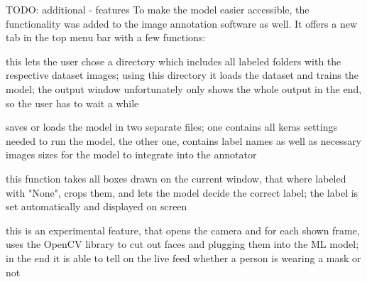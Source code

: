 TODO: additional - features
To make the model easier accessible, the functionality was added to the image
annotation software as well. It offers a new tab in the top menu bar with a few
functions:
\begin{description}[font=\sffamily\bfseries, leftmargin=1cm, style=nextline]
    \item[train model]
        this lets the user chose a directory which includes all labeled folders
        with the respective dataset images; using this directory it loads the
        dataset and trains the model; the output window unfortunately only shows
        the whole output in the end, so the user has to wait a while
    \item[save/load model]
        saves or loads the model in two separate files; one contains all keras
        settings needed to run the model, the other one, contains label names as
        well as necessary images sizes for the model to integrate into the
        annotator 
    \item[classify current image]
        this function takes all boxes drawn on the current window, that where
        labeled with "None", crops them, and lets the model decide the correct
        label; the label is set automatically and displayed on screen
    \item[live classification]
        this is an experimental feature, that opens the camera and for each
        shown frame, uses the OpenCV library to cut out faces and plugging them
        into the ML model; in the end it is able to tell on the live feed
        whether a person is wearing a mask or not
\end{description}
